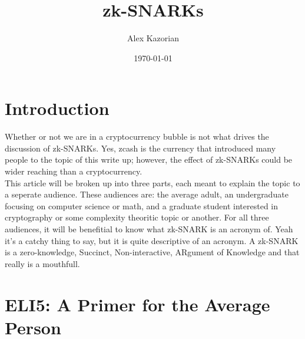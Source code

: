 \documentclass{article}
\title{zk-SNARKs}
\author{Alex Kazorian}
\date{\today}
\begin{document}
\maketitle
\section{Introduction}
Whether or not we are in a cryptocurrency bubble is not what drives the discussion of zk-SNARKs. Yes, zcash is the currency that introduced many people to the topic of this write up; however, the effect of zk-SNARKs could be wider reaching than a cryptocurrency. \\
This article will be broken up into three parts, each meant to explain the topic to a seperate audience. These audiences are: the average adult, an undergraduate focusing on computer science or math, and a graduate student interested in cryptography or some complexity theoritic topic or another. For all three audiences, it will be benefitial to know what zk-SNARK is an acronym of. Yeah it's a catchy thing to say, but it is quite descriptive of an acronym. A zk-SNARK is a zero-knowledge, Succinct, Non-interactive, ARgument of Knowledge and that really is a mouthfull.

\section{ELI5: A Primer for the Average Person}
\end{document}
